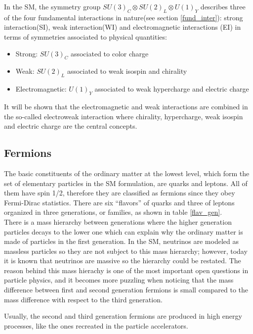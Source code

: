 \noindent In the SM, the symmetry group $SU(3)_C\otimes SU(2)_L\otimes U(1)_Y$ describes three of the four fundamental interactions in nature(see section \ref{fund_inter}): strong interaction(SI), weak interaction(WI) and electromagnetic interactions (EI) in terms of symmetries associated to physical quantities:
\begin{itemize}
\item Strong: $SU(3)_C$ associated to color charge
\item Weak: $SU(2)_L$ associated to weak isospin and chirality
\item Electromagnetic: $U(1)_Y$ associated to weak hypercharge and electric charge
\end{itemize}

\noindent It will be shown that the electromagnetic and weak interactions are combined in the so-called electroweak interaction where chirality, hypercharge, weak isospin and electric charge are the central concepts.

\subsection{Fermions}\label{fermions}

\noindent The basic constituents of the ordinary matter at the lowest level, which form the set of elementary particles in the SM formulation, are quarks and leptons. All of them have spin 1/2, therefore they are classified as fermions since they obey Fermi-Dirac statistics. There are six ``flavors'' of quarks and three of leptons organized in three generations, or families, as shown in table \ref{flav_gen}.\\

\noindent There is a mass hierarchy between generations where the higher generation particles decays to the lower one which can explain why the ordinary matter is made of particles in the first generation. In the SM, neutrinos are modeled as massless particles so they are not subject to this mass hierarchy; however, today it is known that neutrinos are massive so the hierarchy could be restated. The reason behind this mass hierachy is one of the most important open questions in particle physics, and it becomes more puzzling when noticing that the mass difference between first and second generation fermions is small compared to the mass difference with respect to the third generation.

\noindent Usually, the second and third generation fermions are produced in high energy processes, like the ones recreated in the particle accelerators.         
 
